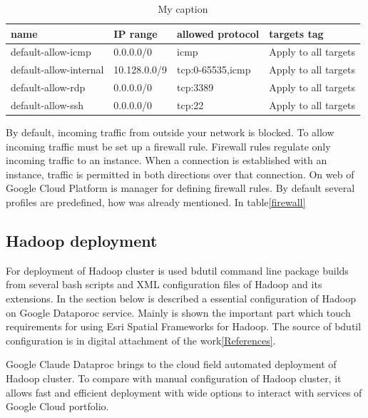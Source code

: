 \documentclass[a4paper,12pt,oneside]{report}
\begin{document}
	\begin{table}[!htbp]
		\centering
		\begin{scriptsize}
			\begin{tabular}{@{}|l|l|l|l|@{}}
				\toprule
				name                   & IP range     & allowed protocol & targets tag         
				\\ \midrule  \midrule
				default-allow-icmp     & 0.0.0.0/0    & icmp             & Apply to all targets
				\\ \midrule
				default-allow-internal & 10.128.0.0/9 & tcp:0-65535,icmp & Apply to all targets
				\\ \midrule
				default-allow-rdp      & 0.0.0.0/0    & tcp:3389         & Apply to all targets
				\\ \midrule
				default-allow-ssh      & 0.0.0.0/0    & tcp:22           & Apply to all targets
				\\ \bottomrule
			\end{tabular}
		\end{scriptsize}
		\caption{My caption}
		\label{my-label}
	\end{table}
	By default, incoming traffic from outside your network is blocked. To allow
	incoming traffic must be set up a firewall rule. Firewall rules regulate only incoming
	traffic to an instance. When a connection is established with an instance,
	traffic is permitted in both directions over that connection. On web of Google
	Cloud Platform is manager for defining firewall rules. By default several
	profiles are predefined, how was already mentioned. In table\ref{firewall}
	
	
	
	\subsection{Hadoop deployment}
	For deployment of Hadoop cluster is used bdutil command line package builds from
	several bash scripts and XML configuration files of Hadoop and its extensions. 
	In the section below is described a essential configuration of Hadoop on Google Dataporoc 
	service. Mainly is shown the important part which touch requirements for using
	Esri Spatial Frameworks for Hadoop. The source of bdutil configuration  is in digital attachment of the work\ref{References}.
	
	Google Claude Dataproc brings to the cloud field automated deployment of Hadoop
	cluster. To compare with manual configuration of Hadoop cluster, it allows fast and efficient
	deployment with wide options to interact with services of Google Cloud portfolio.
	
\end{document}
